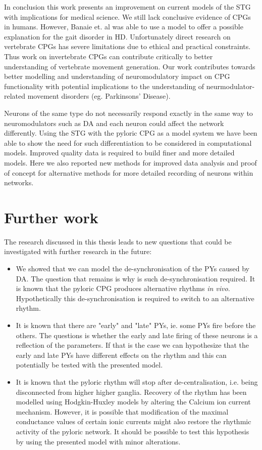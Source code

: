 In conclusion this work presents an improvement on current models of the \ac{STG} with implications for medical science. We still lack conclusive evidence of \acp{CPG} in humans. However, Banaie et. al \cite{Banaie2009} was able to use a model to offer a possible explanation for the gait disorder in \ac{HD}. Unfortunately direct research on vertebrate \acp{CPG} has severe limitations due to ethical and practical constraints. Thus work on invertebrate \acp{CPG} can contribute critically to better understanding of vertebrate movement generation. Our work contributes towards better modelling and understanding of neuromodulatory impact on \ac{CPG} functionality with potential implications to the understanding of neurmodulator-related movement disorders (eg. Parkinsons' Disease). 

Neurons of the same type do not necessarily respond exactly in the same way to neuromodulators such as \ac{DA} and each neuron could affect the network differently. Using the \ac{STG} with the pyloric \ac{CPG} as a model system we have been able to show the need for such differentiation to be considered in computational models. Improved quality data is required to build finer and more detailed models. Here we also reported new methods for improved data analysis and proof of concept for alternative methods for more detailed recording of neurons within networks.

\section{Further work}

The research discussed in this thesis leads to new questions that could be investigated with further research in the future:

\begin{itemize}
	\item We showed that we can model the de-synchronisation of the \acp{PY} caused by \ac{DA}. The question that remains is why is such de-synchronisation required. It is known that the pyloric \ac{CPG} produces alternative rhythms \textit{in vivo}. Hypothetically this de-synchronisation is required to switch to an alternative rhythm.
	\item It is known that there are "early" and "late" \acp{PY}, ie. some \acp{PY} fire before the others. The questions is whether the early and late firing of these neurons is a reflection of the parameters. If that is the case we can hypothesize that the early and late \acp{PY} have different effects on the rhythm and this can potentially be tested with the presented model.
	\item It is known that the pyloric rhythm will stop after de-centralisation, i.e. being disconnected from higher higher ganglia. Recovery of the rhythm has been modelled using Hodgkin-Huxley models by altering the Calcium ion current mechanism. However, it is possible that modification of the maximal conductance values of certain ionic currents might also restore  the rhythmic activity of the pyloric network. It should be possible to test this hypothesis by using the presented model with minor alterations.
\end{itemize}
